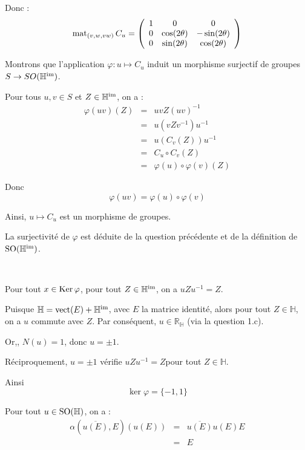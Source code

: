 Donc :
\[ \operatorname{mat}_{(v, w, v w)} C_u = \left(\begin{array}{ccc}
     1 & 0 & 0\\
     0 & \cos (2 \theta) & - \sin (2 \theta)\\
     0 & \sin (2 \theta) & \cos (2 \theta)
   \end{array}\right) \]


 Montrons que l'application $\varphi : u \longmapsto C_u$ induit
un morphisme surjectif de groupes $S \rightarrow S O
(\mathbb{H}^{\operatorname{im}})$.

Pour tous $u, v \in S$ et $Z \in \mathbb{H}^{\operatorname{im}}$, on a :
\begin{eqnarray*}
  \varphi (u v) (Z) & = & u v Z (u v)^{- 1}\\
  & = & u (v Z v^{- 1}) u^{- 1}\\
  & = & u (C_v (Z)) u^{- 1}\\
  & = & C_u \circ C_v (Z)\\
  & = & \varphi (u) \circ \varphi (v) (Z)
\end{eqnarray*}


Donc
\[ \varphi (u v) = \varphi (u) \circ \varphi (v) \]


Ainsi, $u \longmapsto C_u$ est un morphisme de groupes.

La surjectivit{\'e} de $\varphi$ est d{\'e}duite de la question
pr{\'e}c{\'e}dente et de la d{\'e}finition de $\operatorname{SO}
(\mathbb{H}^{\operatorname{im}})$.

\

Pour tout $x \in \operatorname{Ker} \varphi$, pour tout $Z \in
\mathbb{H}^{\operatorname{im}}$, on a $u Z u^{- 1} = Z$.

Puisque $\mathbb{H}= \operatorname{vect} (E) +\mathbb{H}^{\operatorname{im}}$, avec $E$ la
matrice identit{\'e}, alors pour tout $Z \in \mathbb{H}$, on a $u$ commute
avec $Z$. Par cons{\'e}quent, $u \in \mathbb{R}_{\mathbb{H}}$ (via la question
1.c).

Or,, $N (u) = 1$, donc $u = \pm 1$.

R{\'e}ciproquement, $u = \pm 1$ v{\'e}rifie $u Z u^{- 1} = Z$pour tout $Z \in
\mathbb{H}$.

Ainsi
\[ \ker \varphi = \{ - 1, 1 \} \]


 \tmtextbf{}Pour tout $u \in \operatorname{SO} (\mathbb{H})$, on a :
\begin{eqnarray*}
  \alpha (\overline{u (E)}, E) (u (E)) & = & \overline{u (E)} u (E) E\\
  & = & E
\end{eqnarray*}


